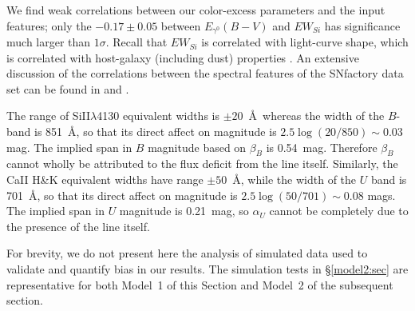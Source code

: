 \documentclass{aastex61}   	%
\begin{document}
We find weak correlations between our color-excess parameters and the input features; 
\color{purple}
only the $ -0.17 \pm 0.05$ between $E_{\gamma^0}(B-V)$ and $EW_{Si}$ has significance much larger than $1 \sigma$.
\color{black}
Recall that $EW_{Si}$ is correlated with light-curve shape, which is correlated with host-galaxy (including dust) properties 
\citep{2000AJ....120.1479H, 2003MNRAS.340.1057S}.
An extensive discussion of the correlations between the spectral features of the SNfactory data set can be found in \citet{chotard:thesis}
and \citet{leget:thesis}.

The range of SiII$\lambda$4130 equivalent widths is $\pm 20$~\AA\ whereas the width of the $B$-band is 851~\AA, so that its direct affect on magnitude
is
$2.5 \log{(20/850)} \sim 0.03$ mag.  
The implied span in $B$ magnitude based on $\beta_B$ is 0.54~mag.  Therefore $\beta_B$ cannot wholly be attributed to the flux deficit
from the line itself.
Similarly, the CaII H\&K equivalent widths have range $\pm 50$~\AA, while the width of the $U$ band is
701~\AA, so that its direct affect on magnitude
is
$2.5 \log{(50/701)} \sim 0.08$ mags.   The implied span in $U$ magnitude is  0.21~mag, so $\alpha_U$ cannot be completely due to the 
presence of the line itself.

\color{purple}
For brevity, we do not present here the analysis of simulated data used to validate and quantify bias in our results.
The simulation tests in \S\ref{model2:sec} are representative for both Model~1 of this Section and Model~2 of the subsequent section.
\color{black}
\end{document}
